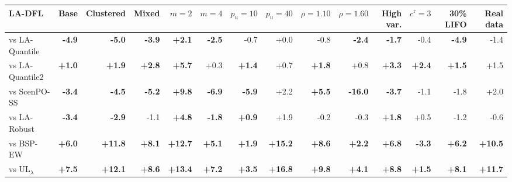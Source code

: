 \begin{tabular}{lrrrrrrrrrrrrr}
\toprule
LA-DFL & Base & Clustered & Mixed & $m=2$ & $m=4$ & $p_u=10$ & $p_u=40$ & $\rho=1.10$ & $\rho=1.60$ & High var. & $c^{\mathrm{r}}=3$ & 30\% LIFO & Real data \\
\midrule
vs LA-Quantile & \textbf{-4.9} & \textbf{-5.0} & \textbf{-3.9} & \textbf{+2.1} & \textbf{-2.5} & -0.7 & +0.0 & -0.8 & \textbf{-2.4} & \textbf{-1.7} & -0.4 & \textbf{-4.9} & -1.4 \\
vs LA-Quantile2 & \textbf{+1.0} & \textbf{+1.9} & \textbf{+2.8} & \textbf{+5.7} & +0.3 & \textbf{+1.4} & +0.7 & \textbf{+1.8} & +0.8 & \textbf{+3.3} & \textbf{+2.4} & \textbf{+1.5} & +1.5 \\
vs ScenPO-SS & \textbf{-3.4} & \textbf{-4.5} & \textbf{-5.2} & \textbf{+9.8} & \textbf{-6.9} & \textbf{-5.9} & +2.2 & \textbf{+5.5} & \textbf{-16.0} & \textbf{-3.7} & -1.1 & -1.8 & +2.0 \\
vs LA-Robust & \textbf{-3.4} & \textbf{-2.9} & -1.1 & \textbf{+4.8} & \textbf{-1.8} & \textbf{+0.9} & +1.9 & -0.2 & -0.3 & \textbf{+1.8} & +0.5 & -1.2 & -0.6 \\
vs BSP-EW & \textbf{+6.0} & \textbf{+11.8} & \textbf{+8.1} & \textbf{+12.7} & \textbf{+5.1} & \textbf{+1.9} & \textbf{+15.2} & \textbf{+8.6} & \textbf{+2.2} & \textbf{+6.8} & \textbf{-3.3} & \textbf{+6.2} & \textbf{+10.5} \\
vs UL$_\lambda$ & \textbf{+7.5} & \textbf{+12.1} & \textbf{+8.6} & \textbf{+13.4} & \textbf{+7.2} & \textbf{+3.5} & \textbf{+16.8} & \textbf{+9.8} & \textbf{+4.1} & \textbf{+8.8} & \textbf{+1.5} & \textbf{+8.1} & \textbf{+11.7} \\
\bottomrule
\end{tabular}
